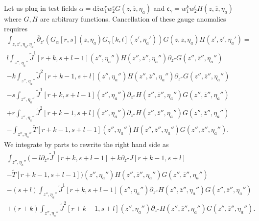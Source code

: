 \documentclass[11pt]{amsart}
\newcommand{\dbar}{\br{\partial}}
\newcommand{\zbar}{\br{z}}
\newcommand{\til}{\widetilde}
\newcommand{\br}{\overline}
\newcommand{\mf}{\mathfrak}
\renewcommand{\d}{\mathrm{d}}
\theoremstyle{thm}
\numberwithin{equation}{subsection}
\theoremstyle{def}
\theoremstyle{rem}
\newcommand{\fc}{\mf{c}}
\begin{document}
Let us plug in test fields $\alpha = \d \zbar w_1^r w_2^s G(z,\zbar,\eta_a)$ and $\fc_\gamma = w_1^k w_2^l H(z,\zbar, \eta_a)$ where $G,H$ are arbitrary functions.  
Cancellation of these gauge anomalies requires
\begin{multline}
\int_{z,z',\eta_a,\eta_a'} \dbar_{z'} \left(G_\alpha[r,s] (z,\eta_a) G_\gamma[k,l] (z',\eta_a')\right) G(z,\zbar, \eta_a) H(z',\zbar',\eta_a') = \\ l \int_{z'',\eta_a''} \til{J}^1[r+k,s+l-1] (z'',\eta_a'') H(z'',\zbar'', \eta_a'') \partial_{z''} G(z'', \zbar'', \eta_a'') \\
- k \int_{z'',\eta_a''} \til{J}^2[r+k-1,s+l] (z'',\eta_a'') H(z'',\zbar'', \eta_a'') \partial_{z''} G(z'', \zbar'', \eta_a'') \\
-s \int_{z'',\eta_a''} \til{J}^1[r+k,s+l-1] (z'',\eta_a'') \partial_{z''} H(z'',\zbar'', \eta_a'')  G(z'', \zbar'', \eta_a'') \\
+ r \int_{z'',\eta_a''} \til{J}^2[r+k-1,s+l] (z'',\eta_a'') \partial_{z''} H(z'',\zbar'', \eta_a'') G(z'', \zbar'', \eta_a'') \\
- \int_{z'',\eta_a''} \til{T}[r+k-1,s+l-1] (z'',\eta_a'') H(z'',\zbar'',\eta_a'') G(z'',\zbar'', \eta_a'') .
\end{multline}
We integrate by parts to rewrite the right hand side as
\begin{multline}
\int_{z'',\eta_a''} \bigg( -l \partial_{z''} \til{J}^1[r+k,s+l-1] + k \partial_{z''} J[r+k-1,s+l] \\  - \til{T}[r+k-1, s+l-1]\bigg) (z'',\eta_a'') H(z'',\zbar'', \eta_a'') G(z'', \zbar'', \eta_a'') \\ - (s+l) \int_{z'',\eta_a''} \til{J}^1[r+k,s+l-1] (z'',\eta_a'') \partial_{z''} H(z'',\zbar'', \eta_a'') G(z'', \zbar'', \eta_a'')
\\
+ (r+k) \int_{z'',\eta_a''} \til{J}^2[r+k-1,s+l] (z'',\eta_a'') \partial_{z''} H(z'',\zbar'', \eta_a'') G(z'', \zbar'', \eta_a'') .
\end{multline}
\end{document}
